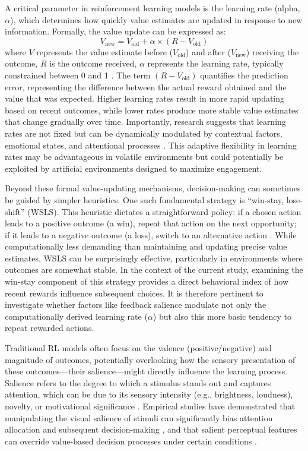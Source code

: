 A critical parameter in reinforcement learning models is the learning rate (alpha, $\alpha$), which determines how quickly value estimates are updated in response to new information. Formally, the value update can be expressed as: 
\begin{equation*}
V_{\text{new}} = V_{\text{old}} + \alpha \times (R - V_{\text{old}})
\end{equation*}
where $V$ represents the value estimate before ($V_{\text{old}}$) and after ($V_{\text{new}}$) receiving the outcome, $R$ is the outcome received, $\alpha$ represents the learning rate, typically constrained between 0 and 1 \citep{sutton2020}. The term $(R-V_{\text{old}})$ quantifies the prediction error, representing the difference between the actual reward obtained and the value that was expected. Higher learning rates result in more rapid updating based on recent outcomes, while lower rates produce more stable value estimates that change gradually over time. Importantly, research suggests that learning rates are not fixed but can be dynamically modulated by contextual factors, emotional states, and attentional processes \citep{lepelley2016, pike2022, wu2017}. This adaptive flexibility in learning rates may be advantageous in volatile environments but could potentially be exploited by artificial environments designed to maximize engagement.

Beyond these formal value-updating mechanisms, decision-making can sometimes be guided by simpler heuristics. One such fundamental strategy is ``win-stay, lose-shift'' (WSLS). This heuristic dictates a straightforward policy: if a chosen action leads to a positive outcome (a win), repeat that action on the next opportunity; if it leads to a negative outcome (a loss), switch to an alternative action \citep{robbins1952, nowak1993}. While computationally less demanding than maintaining and updating precise value estimates, WSLS can be surprisingly effective, particularly in environments where outcomes are somewhat stable. In the context of the current study, examining the win-stay component of this strategy provides a direct behavioral index of how recent rewards influence subsequent choices. It is therefore pertinent to investigate whether factors like feedback salience modulate not only the computationally derived learning rate ($\alpha$) but also this more basic tendency to repeat rewarded actions.

Traditional RL models often focus on the valence (positive/negative) and magnitude of outcomes, potentially overlooking how the sensory presentation of these outcomes—their salience—might directly influence the learning process. Salience refers to the degree to which a stimulus stands out and captures attention, which can be due to its sensory intensity (e.g., brightness, loudness), novelty, or motivational significance \citep{berridge1998, itti2001}. Empirical studies have demonstrated that manipulating the visual salience of stimuli can significantly bias attention allocation and subsequent decision-making \citep{towal2013}, and that salient perceptual features can override value-based decision processes under certain conditions \citep{tsetsos2012}.

